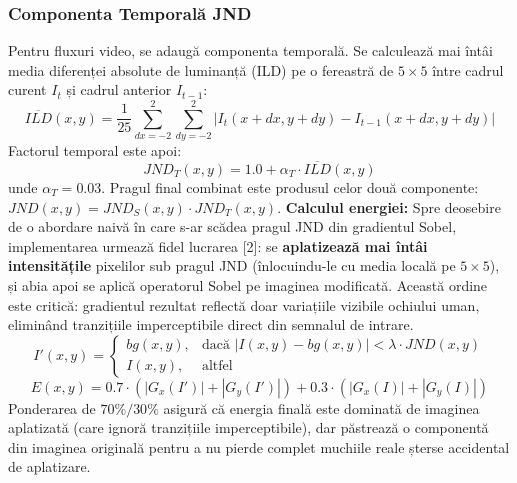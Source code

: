 \documentclass[12pt,a4paper]{article}
\begin{document}
\subsubsection{Componenta Temporală JND}
Pentru fluxuri video, se adaugă componenta temporală. Se calculează mai întâi media diferenței absolute de luminanță (ILD) pe o fereastră de $5 \times 5$ între cadrul curent $I_t$ și cadrul anterior $I_{t-1}$:
\begin{equation}
\overline{ILD}(x,y) = \frac{1}{25} \sum_{dx=-2}^{2} \sum_{dy=-2}^{2} |I_t(x{+}dx, y{+}dy) - I_{t-1}(x{+}dx, y{+}dy)|
\end{equation}
Factorul temporal este apoi:
\begin{equation}
JND_T(x,y) = 1.0 + \alpha_T \cdot \overline{ILD}(x,y)
\end{equation}
unde $\alpha_T = 0.03$. Pragul final combinat este produsul celor două componente: $JND(x,y) = JND_S(x,y) \cdot JND_T(x,y)$.
\textbf{Calculul energiei:} Spre deosebire de o abordare naivă în care s-ar scădea pragul JND din gradientul Sobel, implementarea urmează fidel lucrarea [2]: se \textbf{aplatizează mai întâi intensitățile} pixelilor sub pragul JND (înlocuindu-le cu media locală pe $5 \times 5$), și abia apoi se aplică operatorul Sobel pe imaginea modificată. Această ordine este critică: gradientul rezultat reflectă doar variațiile vizibile ochiului uman, eliminând tranzițiile imperceptibile direct din semnalul de intrare.
\begin{equation}
I'(x,y) = 
\begin{cases}
bg(x,y), & \text{dacă } |I(x,y) - bg(x,y)| < \lambda \cdot JND(x,y) \\
I(x,y), & \text{altfel}
\end{cases}
\end{equation}
\begin{equation}
E(x,y) = 0.7 \cdot \left(|G_x(I')| + |G_y(I')|\right) + 0.3 \cdot \left(|G_x(I)| + |G_y(I)|\right)
\end{equation}
Ponderarea de $70\%/30\%$ asigură că energia finală este dominată de imaginea aplatizată (care ignoră tranzițiile imperceptibile), dar păstrează o componentă din imaginea originală pentru a nu pierde complet muchiile reale șterse accidental de aplatizare.
\end{document}
